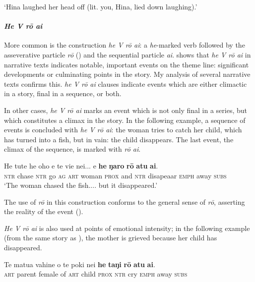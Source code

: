 \glt 
‘Hina laughed her head off (lit. you, Hina, lied down laughing).’ \textstyleExampleref{[R313.025]} 
\z

\paragraph{\textit{He V rō {\ꞌ}ai}}\label{sec:7.2.3.3.2} More common is the construction \textit{he V rō {\ꞌ}ai}: a \textit{he}{}-marked verb followed by the asseverative particle \textit{rō} () and the sequential particle \textit{{\ꞌ}ai}. \citet[125]{WeberR2003} shows that \textit{he V rō {\ꞌ}ai} in narrative texts indicates notable, important events on the theme line: significant developments or culminating points in the story. My analysis of several narrative texts confirms this. \textit{he V rō {\ꞌ}ai} clauses indicate events which are either climactic in a story, final in a sequence, or both.

In other cases, \textit{he V rō {\ꞌ}ai} marks an event which is not only final in a series, but which constitutes a climax in the story. In the following example, a sequence of events is concluded with \textit{he V rō {\ꞌ}ai}: the woman tries to catch her child, which has turned into a fish, but in vain: the child disappears. The last event, the climax of the sequence, is marked with \textit{rō {\ꞌ}ai}.

\ea\label{ex:7.12}
\gll He tute he oho e te vi{\ꞌ}e nei... {\ꞌ}e \textbf{he} \textbf{ŋaro} \textbf{rō} \textbf{atu} \textbf{{\ꞌ}ai}.\\
\textsc{ntr} chase \textsc{ntr} go \textsc{ag} \textsc{art} woman \textsc{prox} and \textsc{ntr} disapeaar \textsc{emph} away \textsc{subs}\\

\glt
‘The woman chased the fish.... but it disappeared.’ \textstyleExampleref{[R338.009]} 
\z

The use of \textit{rō} in this construction conforms to the general sense of \textit{rō}, asserting the reality of the event ().

\textit{He V rō {\ꞌ}ai} is also used at points of emotional intensity; in the following example (from the same story as ), the mother is grieved because her child has disappeared.

\ea\label{ex:7.13}
\gll Te matu{\ꞌ}a vahine o te poki nei \textbf{he} \textbf{taŋi} \textbf{rō} \textbf{atu} \textbf{{\ꞌ}ai}.\\
\textsc{art} parent female of \textsc{art} child \textsc{prox} \textsc{ntr} cry \textsc{emph} away \textsc{subs}\\

